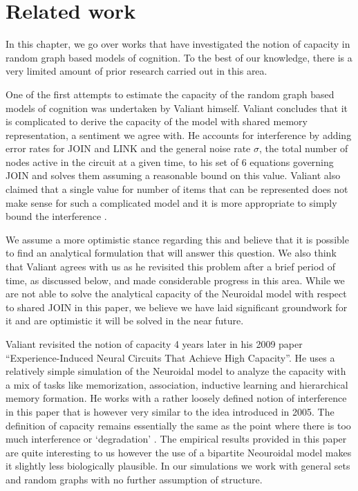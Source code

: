 \chapter{Related work}

In this chapter, we go over works that have investigated the notion of capacity in random graph based models of cognition. To the best of our knowledge, there is a very limited amount of prior research carried out in this area. 

One of the first attempts to estimate the capacity of the random graph based models of cognition was undertaken by Valiant himself. Valiant concludes that it is complicated to derive the capacity of the model with shared memory representation, a sentiment we agree with. He accounts for interference by adding error rates for JOIN and LINK and the general noise rate $\sigma$, the total number of nodes active in the circuit at a given time, to his set of 6 equations governing JOIN and solves them assuming a reasonable bound on this value. Valiant also claimed that a single value for number of items that can be represented does not make sense for such a complicated model and it is more appropriate to simply bound the interference \cite{valiant2005memorization}. 

We assume a more optimistic stance regarding this and believe that it is possible to find an analytical formulation that will answer this question. We also think that Valiant agrees with us as he revisited this problem after a brief period of time, as discussed below, and made considerable progress in this area. While we are not able to solve the analytical capacity of the Neuroidal model with respect to shared JOIN in this paper, we believe we have laid significant groundwork for it and are optimistic it will be solved in the near future.

Valiant revisited the notion of capacity 4 years later in his 2009 paper ``Experience-Induced Neural Circuits That Achieve High Capacity''. He uses a relatively simple simulation of the Neuroidal model to analyze the capacity with a mix of tasks like memorization, association, inductive learning and hierarchical memory formation. He works with a rather loosely defined notion of interference in this paper that is however very similar to the idea introduced in 2005. The definition of capacity remains essentially the same as the point where there is too much interference or `degradation' \cite{feldman2009experience}. The empirical results provided in this paper are quite interesting to us however the use of a bipartite Neouroidal model makes it slightly less biologically plausible. In our simulations we work with general sets and random graphs with no further assumption of structure. 

